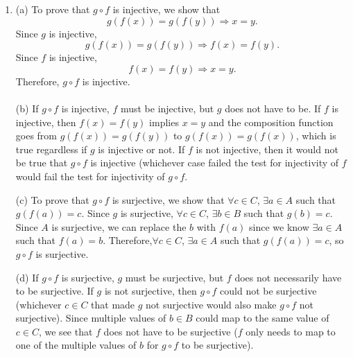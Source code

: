 \documentclass{article}
\begin{document}
\begin{enumerate}
\item
(a) To prove that $g\circ f$ is injective, we show that \[g(f(x))=g(f(y)) \Rightarrow x=y.\] 
Since $g$ is injective, \[g(f(x))=g(f(y)) \Rightarrow f(x)=f(y).\] 
Since $f$ is injective, \[f(x)=f(y) \Rightarrow x=y.\] 
Therefore, $g\circ f$ is injective.
\\\\ (b) If $g \circ f$ is injective, $f$ must be injective, but $g$ does not have to be. If $f$ is injective, then $f(x) = f(y)$ implies $x = y$ and the composition function goes from $g(f(x)) = g(f(y))$ to $g(f(x)) = g(f(x))$, which is true regardless if $g$ is injective or not. If $f$ is not injective, then it would not be true that $g \circ f$ is injective (whichever case failed the test for injectivity of $f$ would fail the test for injectivity of $g \circ f$. 

(c) To prove that $g\circ f$ is surjective, we show that $\forall c \in C$, $\exists a \in A$ such that $g(f(a)) = c$. Since $g$ is surjective, $\forall c \in C$, $\exists b \in B$ such that $g(b) = c$. Since $A$ is surjective, we can replace the $b$ with $f(a)$ since we know $\exists a \in A$ such that $f(a) = b$. Therefore,$\forall c \in C$, $\exists a \in A$ such that $g(f(a)) = c$, so $g\circ f$ is surjective.

(d) If $g \circ f$ is surjective, $g$ must be surjective, but $f$ does not necessarily have to be surjective. If $g$ is not surjective, then $g\circ f$ could not be surjective (whichever $c \in C$ that made $g$ not surjective would also make $g\circ f$ not surjective). Since multiple values of $b \in B$ could map to the same value of $c \in C$, we see that $f$ does not have to be surjective ($f$ only needs to map to one of the multiple values of $b$ for $g \circ f$ to be surjective).



\end{enumerate}
\end{document}
